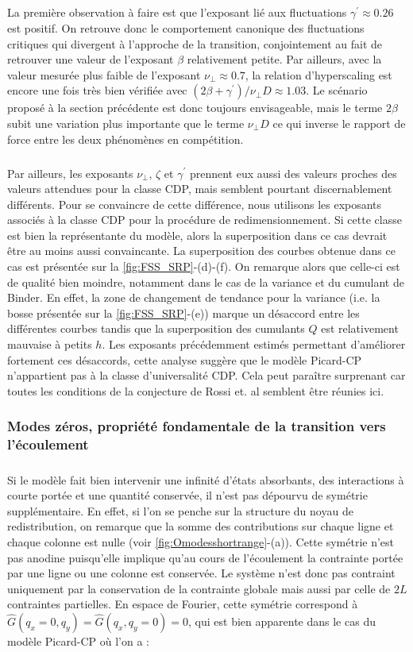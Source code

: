 \subparagraph{} La première observation à faire est que l'exposant lié aux fluctuations $\gamma^\prime \approx 0.26$ est positif. On retrouve donc le comportement canonique des fluctuations critiques qui divergent à l'approche de la transition, conjointement au fait de retrouver une valeur de l'exposant $\beta$ relativement petite. Par ailleurs, avec la valeur mesurée plus faible de l'exposant $\nu_\perp \approx 0.7$, la relation d'hyperscaling est encore une fois très bien vérifiée avec $(2\beta + \gamma^\prime)/\nu_\perp D \approx 1.03$. Le scénario proposé à la section précédente est donc toujours envisageable, mais le terme $2\beta$ subit une variation plus importante que le terme $\nu_\perp D$ ce qui inverse le rapport de force entre les deux phénomènes en compétition.

\subparagraph{}Par ailleurs, les exposants $\nu_\perp$, $\zeta$ et $\gamma^\prime$ prennent eux aussi des valeurs proches des valeurs attendues pour la classe CDP, mais semblent pourtant discernablement différents. Pour se convaincre de cette différence, nous utilisons les exposants associés à la classe CDP pour la procédure de redimensionnement. Si cette classe est bien la représentante du modèle, alors la superposition dans ce cas devrait être au moins aussi convaincante. La superposition des courbes obtenue dans ce cas est présentée sur la \autoref{fig:FSS_SRP}-(d)-(f). On remarque alors que celle-ci est de qualité bien moindre, notamment dans le cas de la variance et du cumulant de Binder. En effet, la zone de changement de tendance pour la variance (i.e. la bosse présentée sur la \autoref{fig:FSS_SRP}-(e)) marque un désaccord entre les différentes courbes tandis que la superposition des cumulants $Q$ est relativement mauvaise à petits $h$. Les exposants précédemment estimés permettant d'améliorer fortement ces désaccords, cette analyse suggère que le modèle Picard-CP n'appartient pas à la classe d'universalité CDP. Cela peut paraître surprenant car toutes les conditions de la conjecture de Rossi et. al \cite{rossi_universality_2000} semblent être réunies ici.

\subsubsection{Modes zéros, propriété fondamentale de la transition vers l'écoulement}

\subparagraph{}Si le modèle fait bien intervenir une infinité d'états absorbants, des interactions à courte portée et une quantité conservée, il n'est pas dépourvu de symétrie supplémentaire. En effet, si l'on se penche sur la structure du noyau de redistribution, on remarque que la somme des contributions sur chaque ligne et chaque colonne est nulle (voir \autoref{fig:Omodesshortrange}-(a)). Cette symétrie n'est pas anodine puisqu'elle implique qu'au cours de l'écoulement la contrainte portée par une ligne ou une colonne est conservée. Le système n'est donc pas contraint uniquement par la conservation de la contrainte globale mais aussi par celle de $2L$ contraintes partielles. En espace de Fourier, cette symétrie correspond à $\hat{G}(q_x=0,q_y)=\hat{G}(q_x,q_y=0)=0$, qui est bien apparente dans le cas du modèle Picard-CP où l'on a :

